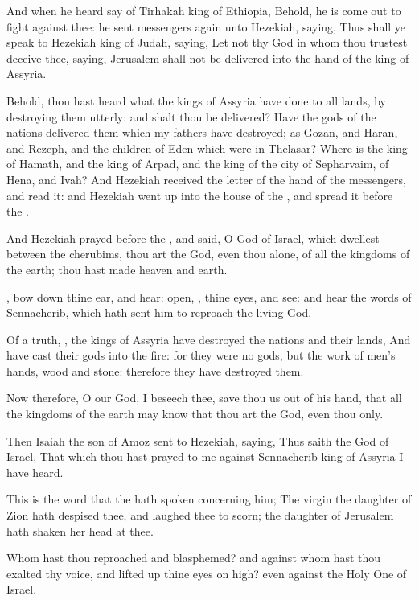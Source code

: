 \verse And when he heard say of Tirhakah king of Ethiopia, Behold, he is come out to fight against thee: he sent messengers again unto Hezekiah, saying, \verse Thus shall ye speak to Hezekiah king of Judah, saying, Let not thy God in whom thou trustest deceive thee, saying, Jerusalem shall not be delivered into the hand of the king of Assyria.

\verse Behold, thou hast heard what the kings of Assyria have done to all lands, by destroying them utterly: and shalt thou be delivered?  \verse Have the gods of the nations delivered them which my fathers have destroyed; as Gozan, and Haran, and Rezeph, and the children of Eden which were in Thelasar?  \verse Where is the king of Hamath, and the king of Arpad, and the king of the city of Sepharvaim, of Hena, and Ivah?  \verse And Hezekiah received the letter of the hand of the messengers, and read it: and Hezekiah went up into the house of the \LORD, and spread it before the \LORD.

\verse And Hezekiah prayed before the \LORD, and said, O \LORD God of Israel, which dwellest between the cherubims, thou art the God, even thou alone, of all the kingdoms of the earth; thou hast made heaven and earth.

\verse \LORD, bow down thine ear, and hear: open, \LORD, thine eyes, and see: and hear the words of Sennacherib, which hath sent him to reproach the living God.

\verse Of a truth, \LORD, the kings of Assyria have destroyed the nations and their lands, \verse And have cast their gods into the fire: for they were no gods, but the work of men's hands, wood and stone: therefore they have destroyed them.

\verse Now therefore, O \LORD our God, I beseech thee, save thou us out of his hand, that all the kingdoms of the earth may know that thou art the \LORD God, even thou only.

\verse Then Isaiah the son of Amoz sent to Hezekiah, saying, Thus saith the \LORD God of Israel, That which thou hast prayed to me against Sennacherib king of Assyria I have heard.

\verse This is the word that the \LORD hath spoken concerning him; The virgin the daughter of Zion hath despised thee, and laughed thee to scorn; the daughter of Jerusalem hath shaken her head at thee.

\verse Whom hast thou reproached and blasphemed? and against whom hast thou exalted thy voice, and lifted up thine eyes on high? even against the Holy One of Israel.

